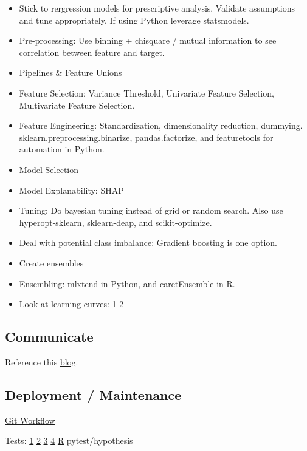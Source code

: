 \documentclass[]{book}
\begin{document}
\begin{itemize}
\item
  Stick to rergression models for prescriptive analysis. Validate
  assumptions and tune appropriately. If using Python leverage
  statsmodels.
\item
  Pre-processing: Use binning + chisquare / mutual information to see
  correlation between feature and target.
\item
  Pipelines \& Feature Unions
\item
  Feature Selection: Variance Threshold, Univariate Feature Selection,
  Multivariate Feature Selection.
\item
  Feature Engineering: Standardization, dimensionality reduction,
  dummying. sklearn.preprocessing.binarize, pandas.factorize, and
  featuretools for automation in Python.
\item
  Model Selection
\item
  Model Explanability: SHAP
\item
  Tuning: Do bayesian tuning instead of grid or random search. Also use
  hyperopt-sklearn, sklearn-deap, and scikit-optimize.
\item
  Deal with potential class imbalance: Gradient boosting is one option.
\item
  Create ensembles
\item
  Ensembling: mlxtend in Python, and caretEnsemble in R.
\item
  Look at learning curves:
  \href{https://www.dataquest.io/blog/learning-curves-machine-learning/}{1}
  \textbar{}
  \href{http://www.scikit-yb.org/en/latest/api/model_selection/learning_curve.html}{2}
\end{itemize}

\subsection{Communicate}\label{communicate}

Reference this
\href{https://www.dataquest.io/blog/data-science-project-style-guide/}{blog}.

\subsection{Deployment / Maintenance}\label{deployment-maintenance}

\href{https://blog.osteele.com/2008/05/my-git-workflow/}{Git Workflow}

Tests:
\href{http://engineering.pivotal.io/post/test-driven-development-for-data-science/}{1}
\textbar{} \href{http://www.tdda.info/}{2} \textbar{}
\href{http://stochasticsolutions.com/}{3} \textbar{}
\href{https://github.com/ericmjl/data-testing-tutorial}{4} \textbar{}
\href{http://r-pkgs.had.co.nz/tests.html}{R} \textbar{}
pytest/hypothesis
\end{document}
